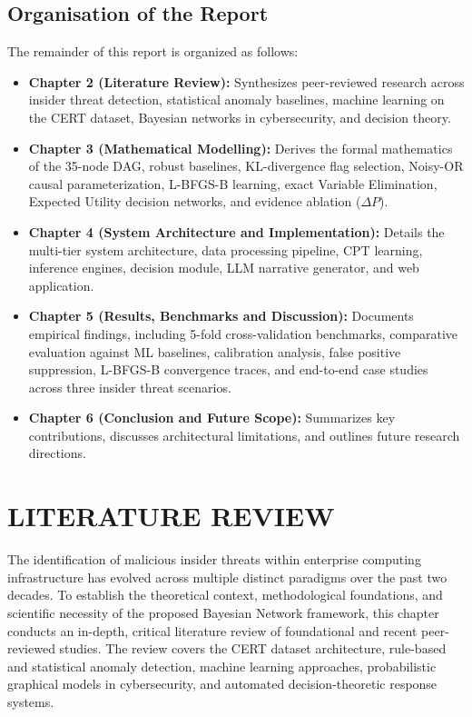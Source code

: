 \documentclass[12pt,a4paper]{report}
\begin{document}
\section{Organisation of the Report}
The remainder of this report is organized as follows:
\begin{itemize}
    \item \textbf{Chapter 2 (Literature Review):} Synthesizes peer-reviewed research across insider threat detection, statistical anomaly baselines, machine learning on the CERT dataset, Bayesian networks in cybersecurity, and decision theory.
    \item \textbf{Chapter 3 (Mathematical Modelling):} Derives the formal mathematics of the 35-node DAG, robust baselines, KL-divergence flag selection, Noisy-OR causal parameterization, L-BFGS-B learning, exact Variable Elimination, Expected Utility decision networks, and evidence ablation ($\Delta P$).
    \item \textbf{Chapter 4 (System Architecture and Implementation):} Details the multi-tier system architecture, data processing pipeline, CPT learning, inference engines, decision module, LLM narrative generator, and web application.
    \item \textbf{Chapter 5 (Results, Benchmarks and Discussion):} Documents empirical findings, including 5-fold cross-validation benchmarks, comparative evaluation against ML baselines, calibration analysis, false positive suppression, L-BFGS-B convergence traces, and end-to-end case studies across three insider threat scenarios.
    \item \textbf{Chapter 6 (Conclusion and Future Scope):} Summarizes key contributions, discusses architectural limitations, and outlines future research directions.
\end{itemize}


\chapter{LITERATURE REVIEW}

The identification of malicious insider threats within enterprise computing infrastructure has evolved across multiple distinct paradigms over the past two decades. To establish the theoretical context, methodological foundations, and scientific necessity of the proposed Bayesian Network framework, this chapter conducts an in-depth, critical literature review of foundational and recent peer-reviewed studies. The review covers the CERT dataset architecture, rule-based and statistical anomaly detection, machine learning approaches, probabilistic graphical models in cybersecurity, and automated decision-theoretic response systems.
\end{document}
